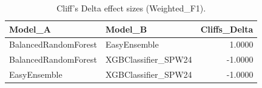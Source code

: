 \begin{table}[t]
\centering
\begin{tabular}{llr}
\toprule
Model_A & Model_B & Cliffs_Delta \\
\midrule
BalancedRandomForest & EasyEnsemble & 1.0000 \\
BalancedRandomForest & XGBClassifier_SPW24 & -1.0000 \\
EasyEnsemble & XGBClassifier_SPW24 & -1.0000 \\
\bottomrule
\end{tabular}
\caption{Cliff's Delta effect sizes (Weighted_F1).}
\label{tab:cliffs_Weighted_F1}
\end{table}